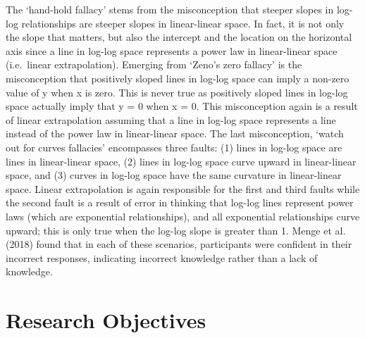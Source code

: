\documentclass[print]{nuthesis}
\begin{document}

The `hand-hold fallacy' stems from the misconception that steeper slopes in log-log relationships are steeper slopes in linear-linear space. In fact, it is not only the slope that matters, but also the intercept and the location on the horizontal axis since a line in log-log space represents a power law in linear-linear space (i.e.~linear extrapolation).
Emerging from `Zeno's zero fallacy' is the misconception that positively sloped lines in log-log space can imply a non-zero value of y when x is zero.
This is never true as positively sloped lines in log-log space actually imply that y = 0 when x = 0. This misconception again is a result of linear extrapolation assuming that a line in log-log space represents a line instead of the power law in linear-linear space.
The last misconception, `watch out for curves fallacies' encompasses three faults: (1) lines in log-log space are lines in linear-linear space, (2) lines in log-log space curve upward in linear-linear space, and (3) curves in log-log space have the same curvature in linear-linear space.
Linear extrapolation is again responsible for the first and third faults while the second fault is a result of error in thinking that log-log lines represent power laws (which are exponential relationships), and all exponential relationships curve upward; this is only true when the log-log slope is greater than 1.
Menge et al. (2018) found that in each of these scenarios, participants were confident in their incorrect responses, indicating incorrect knowledge rather than a lack of knowledge.

\hypertarget{research-objectives}{%
\section{Research Objectives}\label{research-objectives}}
\end{document}
